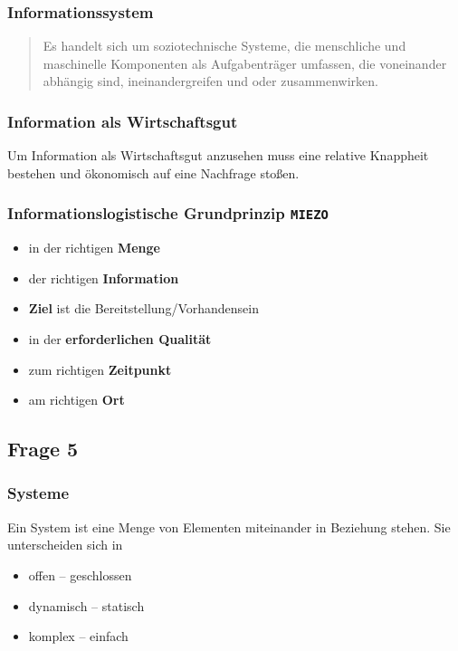 \documentclass[a4paper]{article}
\begin{document}
\subsubsection*{Informationssystem}
\begin{quote}
Es handelt sich um soziotechnische Systeme, die menschliche und maschinelle Komponenten als Aufgabenträger umfassen, die voneinander abhängig sind, ineinandergreifen und oder zusammenwirken.
\end{quote}
\hrulefill
\subsubsection*{Information als Wirtschaftsgut}
Um Information als Wirtschaftsgut anzusehen muss eine relative Knappheit bestehen und ökonomisch auf eine Nachfrage stoßen.
\hrulefill


\hrulefill
\subsubsection*{Informationslogistische Grundprinzip \texttt{MIEZO}}
\begin{itemize}
	\item in der richtigen \textbf{Menge}
	\item der richtigen \textbf{Information}
	\item \textbf{Ziel} ist die Bereitstellung/Vorhandensein
	\item in der \textbf{erforderlichen Qualität} 
	\item zum richtigen \textbf{Zeitpunkt} 
	\item am richtigen \textbf{Ort}
\end{itemize}

\subsection*{Frage 5}
\label{le1-5}
\subsubsection*{Systeme}
Ein System ist eine Menge von Elementen miteinander in Beziehung stehen. Sie unterscheiden sich in
\begin{itemize}
	\item offen -- geschlossen
	\item dynamisch -- statisch
	\item komplex -- einfach
\end{itemize}
\hrulefill
\end{document}

